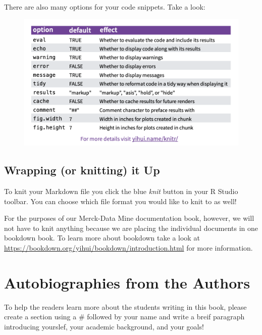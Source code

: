 \documentclass[]{book}
\begin{document}
There are also many options for your code snippets. Take a look:

\begin{figure}
\centering
\includegraphics{images/options.png}
\caption{}
\end{figure}

\section{Wrapping (or knitting) it Up}\label{wrapping-or-knitting-it-up}

To knit your Markdown file you click the blue \emph{knit} button in your
R Studio toolbar. You can choose which file format you would like to
knit to as well!

For the purposes of our Merck-Data Mine documentation book, however, we
will not have to knit anything because we are placing the individual
documents in one bookdown book. To learn more about bookdown take a look
at \url{https://bookdown.org/yihui/bookdown/introduction.html} for more
information.

\chapter{Autobiographies from the
Authors}\label{autobiographies-from-the-authors}

To help the readers learn more about the students writing in this book,
please create a section using a \# followed by your name and write a
breif paragraph introducing yourslef, your academic background, and your
goals!
\end{document}
